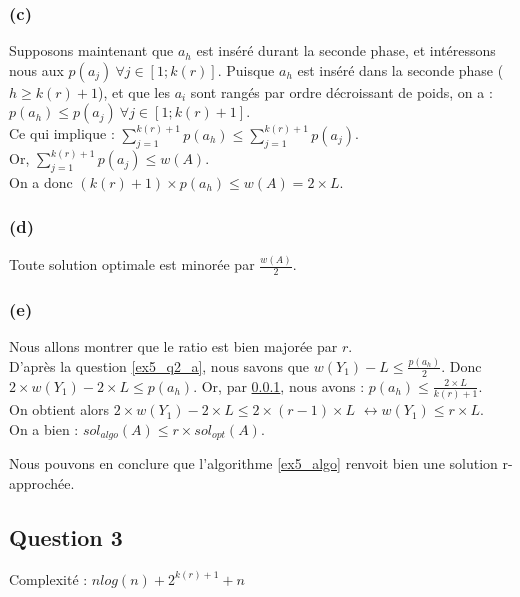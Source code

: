 \subsubsection{(c)}\label{ex5_q2_c}
Supposons maintenant que $a_h$ est inséré durant la seconde phase, et intéressons nous aux 
$p(a_j)\ \forall j \in [1;k(r)]$. 
Puisque $a_h$ est inséré dans la seconde phase ($h \geq k(r)+1$), et que les $a_i$ sont
rangés par ordre décroissant de poids, on a : $p(a_h) \leq p(a_j)\ \forall j \in [1;k(r)+1]$.\\
Ce qui implique : $\sum_{j = 1}^{k(r)+1}p(a_h) \leq \sum_{j = 1}^{k(r)+1} p(a_j)$.\\
Or, $\sum_{j=1}^{k(r)+1}p(a_j) \leq w(A)$. \\
On a donc $(k(r)+1) \times p(a_h) \leq w(A) = 2 \times L$.

\subsubsection{(d)}\label{ex5_q2_d}
Toute solution optimale est minorée par $\frac{w(A)}{2}$.

\subsubsection{(e)}\label{ex5_q2_e}
Nous allons montrer que le ratio est bien majorée par $r$.\\
D'après la question \ref{ex5_q2_a}, nous savons que $w(Y_1) - L \leq \frac{p(a_h)}{2}$.
Donc $2 \times w(Y_1) - 2 \times L \leq p(a_h)$.
Or, par \ref{ex5_q2_c}, nous avons : $p(a_h) \leq \frac{2\times L}{k(r)+1}$.\\
On obtient alors $2 \times w(Y_1) - 2 \times L \leq 2 \times (r - 1) \times L$
$\leftrightarrow w(Y_1) \leq r \times L$.\\
On a bien : $sol_{algo}(A) \leq r \times sol_{opt}(A)$.

Nous pouvons en conclure que l'algorithme \ref{ex5_algo} renvoit bien une solution
r-approchée.

\subsection{Question 3}
Complexité : $nlog(n) + 2^{k(r)+1} + n$

